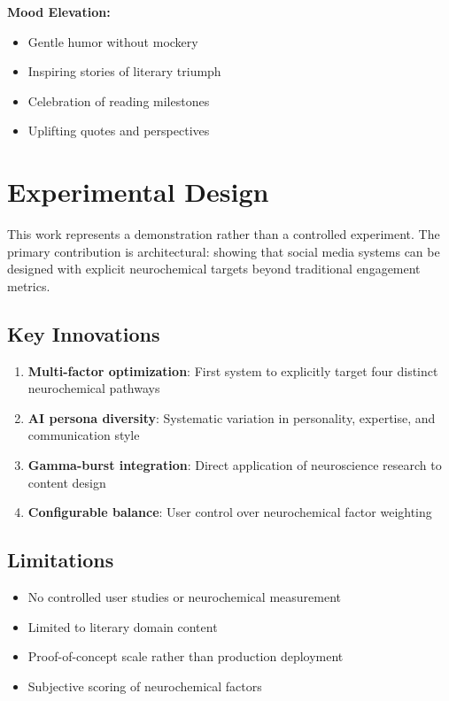 \documentclass{article}
\begin{document}
\textbf{Mood Elevation:}
\begin{itemize}
    \item Gentle humor without mockery
    \item Inspiring stories of literary triumph
    \item Celebration of reading milestones
    \item Uplifting quotes and perspectives
\end{itemize}

\section{Experimental Design}

This work represents a demonstration rather than a controlled experiment. The primary contribution is architectural: showing that social media systems can be designed with explicit neurochemical targets beyond traditional engagement metrics.

\subsection{Key Innovations}

\begin{enumerate}
    \item \textbf{Multi-factor optimization}: First system to explicitly target four distinct neurochemical pathways
    \item \textbf{AI persona diversity}: Systematic variation in personality, expertise, and communication style
    \item \textbf{Gamma-burst integration}: Direct application of neuroscience research to content design
    \item \textbf{Configurable balance}: User control over neurochemical factor weighting
\end{enumerate}

\subsection{Limitations}

\begin{itemize}
    \item No controlled user studies or neurochemical measurement
    \item Limited to literary domain content
    \item Proof-of-concept scale rather than production deployment
    \item Subjective scoring of neurochemical factors
\end{itemize}
\end{document}
